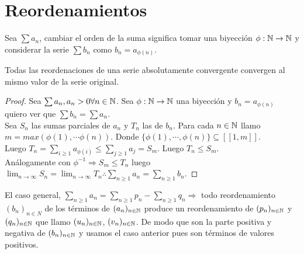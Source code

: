 \section{Reordenamientos}

\begin{definition}
  Sea $\sum a_n$, cambiar el orden de la suma significa tomar una biyección $\phi: \mathbb{N} \to \mathbb{N}$ y considerar la serie $\sum b_n$ como $b_n = a_{\phi(n)}$.
\end{definition}

\begin{theorem}
  Todas las reordenaciones de una serie absolutamente convergente convergen al mismo valor de la serie original.
  \begin{proof}
    Sea $\sum a_n, a_n > 0 \forall n \in \mathbb{N}$. Sea $\phi: \mathbb{N} \to \mathbb{N}$ una biyección y $b_n = a_{\phi(n)}$ quiero ver que $\sum b_n = \sum a_n$. \\
    Sea $S_n$ las sumas parciales de $a_n$ y $T_n$ las de $b_n$. Para cada $n \in \mathbb{N}$ llamo $m = max(\phi(1), \cdots \phi(n))$. Donde $\{ \phi(1), \cdots, \phi(n) \} \subseteq [[1, m]]$. \\
    Luego $T_n = \sum_{i \geq 1} a_{\phi(i)} \leq \sum_{j \geq 1} a_j = S_m$. Luego $T_n \leq S_m$. \\
    Análogamente con $\phi^{-1} \Rightarrow S_m \leq T_n$ luego $\lim_{n \to \infty} S_n = \lim_{n \to \infty} T_n \therefore \sum_{n \geq 1} a_n = \sum_{n \geq 1} b_n$.
  \end{proof}
\end{theorem}

El caso general, $\sum_{n \geq 1} a_n = \sum_{n \geq 1} p_n - \sum_{n \geq 1} q_n \Rightarrow$ todo reordenamiento $(b_n)_{n \in N}$ de los términos de $(a_n)_{n \in \mathbb{N}}$ produce un reordenamiento de $(p_n)_{n \in \mathbb{N}}$ y $(q_n)_{n \in \mathbb{N}}$ que llamo $(u_n)_{n \in \mathbb{N}}$, $(v_n)_{n \in \mathbb{N}}$. De modo que son la parte positiva y negativa de $(b_n)_{n \in \mathbb{N}}$ y usamos el caso anterior pues son términos de valores positivos.



